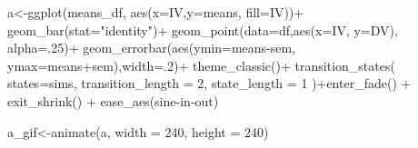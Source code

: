 \documentclass[
  letterpaper,
  DIV=11,
  numbers=noendperiod]{scrreprt}
\newenvironment{Shaded}{\begin{snugshade}}{\end{snugshade}}
\newcommand{\AttributeTok}[1]{\textcolor[rgb]{0.40,0.45,0.13}{#1}}
\newcommand{\DecValTok}[1]{\textcolor[rgb]{0.68,0.00,0.00}{#1}}
\newcommand{\FunctionTok}[1]{\textcolor[rgb]{0.28,0.35,0.67}{#1}}
\newcommand{\NormalTok}[1]{\textcolor[rgb]{0.00,0.23,0.31}{#1}}
\newcommand{\OtherTok}[1]{\textcolor[rgb]{0.00,0.23,0.31}{#1}}
\newcommand{\SpecialCharTok}[1]{\textcolor[rgb]{0.37,0.37,0.37}{#1}}
\newcommand{\StringTok}[1]{\textcolor[rgb]{0.13,0.47,0.30}{#1}}
\begin{document}
\begin{Shaded}
\begin{Highlighting}[]
\NormalTok{a}\OtherTok{\textless{}{-}}\FunctionTok{ggplot}\NormalTok{(means\_df, }\FunctionTok{aes}\NormalTok{(}\AttributeTok{x=}\NormalTok{IV,}\AttributeTok{y=}\NormalTok{means, }\AttributeTok{fill=}\NormalTok{IV))}\SpecialCharTok{+}
  \FunctionTok{geom\_bar}\NormalTok{(}\AttributeTok{stat=}\StringTok{"identity"}\NormalTok{)}\SpecialCharTok{+}
  \FunctionTok{geom\_point}\NormalTok{(}\AttributeTok{data=}\NormalTok{df,}\FunctionTok{aes}\NormalTok{(}\AttributeTok{x=}\NormalTok{IV, }\AttributeTok{y=}\NormalTok{DV), }\AttributeTok{alpha=}\NormalTok{.}\DecValTok{25}\NormalTok{)}\SpecialCharTok{+}
  \FunctionTok{geom\_errorbar}\NormalTok{(}\FunctionTok{aes}\NormalTok{(}\AttributeTok{ymin=}\NormalTok{means}\SpecialCharTok{{-}}\NormalTok{sem, }\AttributeTok{ymax=}\NormalTok{means}\SpecialCharTok{+}\NormalTok{sem),}\AttributeTok{width=}\NormalTok{.}\DecValTok{2}\NormalTok{)}\SpecialCharTok{+}
  \FunctionTok{theme\_classic}\NormalTok{()}\SpecialCharTok{+}
  \FunctionTok{transition\_states}\NormalTok{(}
    \AttributeTok{states=}\NormalTok{sims,}
    \AttributeTok{transition\_length =} \DecValTok{2}\NormalTok{,}
    \AttributeTok{state\_length =} \DecValTok{1}
\NormalTok{  )}\SpecialCharTok{+}\FunctionTok{enter\_fade}\NormalTok{() }\SpecialCharTok{+} 
  \FunctionTok{exit\_shrink}\NormalTok{() }\SpecialCharTok{+}
  \FunctionTok{ease\_aes}\NormalTok{(}\StringTok{\textquotesingle{}sine{-}in{-}out\textquotesingle{}}\NormalTok{)}
  
\NormalTok{a\_gif}\OtherTok{\textless{}{-}}\FunctionTok{animate}\NormalTok{(a, }\AttributeTok{width =} \DecValTok{240}\NormalTok{, }\AttributeTok{height =} \DecValTok{240}\NormalTok{)}


\end{Highlighting}
\end{Shaded}
\end{document}
